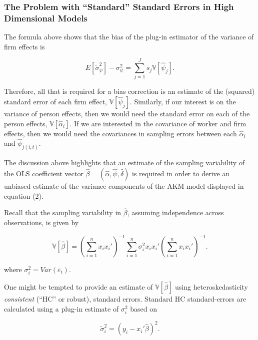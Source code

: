 \documentclass[11pt]{article}
\begin{document}
\hypertarget{the-problem-with-standard-standard-errors-in-high-dimensional-models}{%
\subsubsection{The Problem with ``Standard'' Standard Errors in High
Dimensional
Models}\label{the-problem-with-standard-standard-errors-in-high-dimensional-models}}

The formula above shows that the bias of the plug-in estimator of the
variance of firm effects is

\begin{equation}
E[\tilde{\sigma}_{\psi}^2]-\sigma^{2}_{\psi}=\sum_{j=1}^{J}s_{j}{\mathbb{V}[\hat{\psi}_{j}]}.
\end{equation}

Therefore, all that is required for a bias correction is an estimate of
the (squared) standard error of each firm effect,
\({\mathbb{V}[\hat{\psi}_{j}]}\). Similarly, if our interest is on the
variance of person effects, then we would need the standard error on
each of the person effects, \({\mathbb{V}[\hat{\alpha}_{i}]}\). If we
are interested in the covariance of worker and firm effects, then we
would need the covariances in sampling errors between each
\(\hat{\alpha}_{i}\) and \(\hat{\psi}_{j(i,t)}\).

The discussion above highlights that an estimate of the sampling
variability of the OLS coefficient vector
\(\hat{\beta}=(\hat{\alpha},\hat{\psi},\hat{\delta})\) is required in
order to derive an unbiased estimate of the variance components of the
AKM model displayed in equation (2).

Recall that the sampling variability in \(\hat{\beta}\), assuming
independence across observations, is given by

\begin{equation}
{\mathbb{{V}}}[\hat{\beta}]=\left(\sum_{i=1}^{n}x_{i}x_{i}'\right)^{-1}\sum_{i=1}^{n}{\sigma}^{2}_{i}x_{i}x_{i}'\left(\sum_{i=1}^{n}x_{i}x_{i}'\right)^{-1}.
\end{equation}

where \(\sigma^{2}_{i}=Var(\varepsilon_{i})\).

One might be tempted to provide an estimate of \(\mathbb{V}[\hat{\beta}]\)
using heteroskedasticity \emph{consistent} (``HC'' or robust), standard
errors. Standard \cite{white1980heteroskedasticity} HC standard-errors are calculated using a plug-in
estimate of \(\sigma^{2}_{i}\) based on

\begin{equation}
\tilde{\sigma}^{2}_{i}=(y_{i}-x_{i}'\hat{\beta})^2.
\end{equation}
\end{document}
